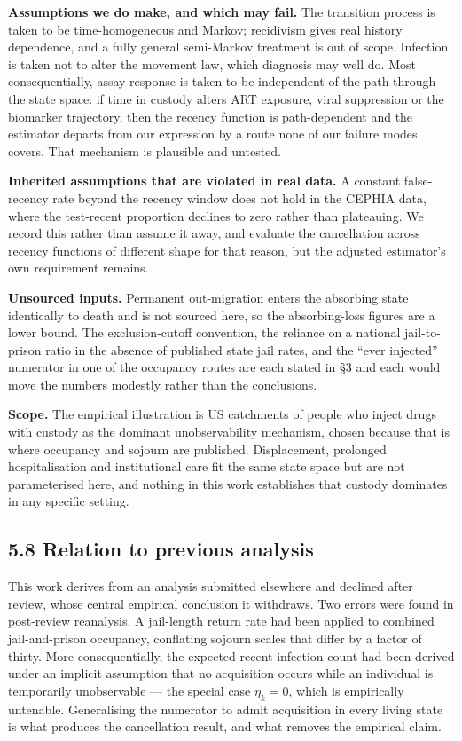 \textbf{Assumptions we do make, and which may fail.} The transition process is taken to be time-homogeneous and Markov; recidivism gives real history dependence, and a fully general semi-Markov treatment is out of scope. Infection is taken not to alter the movement law, which diagnosis may well do. Most consequentially, assay response is taken to be independent of the path through the state space: if time in custody alters ART exposure, viral suppression or the biomarker trajectory, then the recency function is path-dependent and the estimator departs from our expression by a route none of our failure modes covers. That mechanism is plausible and untested.

\textbf{Inherited assumptions that are violated in real data.} A constant false-recency rate beyond the recency window does not hold in the CEPHIA data, where the test-recent proportion declines to zero rather than plateauing. We record this rather than assume it away, and evaluate the cancellation across recency functions of different shape for that reason, but the adjusted estimator's own requirement remains.

\textbf{Unsourced inputs.} Permanent out-migration enters the absorbing state identically to death and is not sourced here, so the absorbing-loss figures are a lower bound. The exclusion-cutoff convention, the reliance on a national jail-to-prison ratio in the absence of published state jail rates, and the ``ever injected'' numerator in one of the occupancy routes are each stated in §3 and each would move the numbers modestly rather than the conclusions.

\textbf{Scope.} The empirical illustration is US catchments of people who inject drugs with custody as the dominant unobservability mechanism, chosen because that is where occupancy and sojourn are published. Displacement, prolonged hospitalisation and institutional care fit the same state space but are not parameterised here, and nothing in this work establishes that custody dominates in any specific setting.

\subsection{5.8 Relation to previous analysis}

This work derives from an analysis submitted elsewhere and declined after review, whose central empirical conclusion it withdraws. Two errors were found in post-review reanalysis. A jail-length return rate had been applied to combined jail-and-prison occupancy, conflating sojourn scales that differ by a factor of thirty. More consequentially, the expected recent-infection count had been derived under an implicit assumption that no acquisition occurs while an individual is temporarily unobservable --- the special case \(\eta_k=0\), which is empirically untenable. Generalising the numerator to admit acquisition in every living state is what produces the cancellation result, and what removes the empirical claim.

